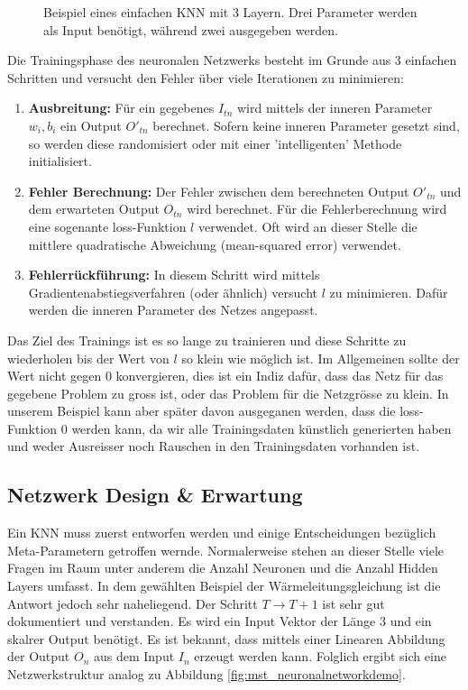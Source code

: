 \begin{figure}[h]
	\centering
	
	\label{fig:mst_neuronalnetwork}
	\caption{Beispiel eines einfachen KNN mit 3 Layern. Drei Parameter werden als Input benötigt, während zwei ausgegeben werden.}
\end{figure}

Die Trainingsphase des neuronalen Netzwerks besteht im Grunde aus 3 einfachen Schritten und versucht den Fehler über viele Iterationen zu minimieren:
\begin{enumerate}
	\item {\textbf{Ausbreitung:} Für ein gegebenes $I_{tn}$ wird mittels der inneren Parameter $w_{i}, b_{i}$ ein Output $O'_{tn}$ berechnet. Sofern keine inneren Parameter gesetzt sind, so werden diese randomisiert oder mit einer 'intelligenten' Methode initialisiert.}
	\item {\textbf{Fehler Berechnung:} Der Fehler zwischen dem berechneten Output $O'_{tn}$ und dem erwarteten Output $O_{tn}$ wird berechnet. Für die Fehlerberechnung wird eine sogenante loss-Funktion $l$ verwendet. Oft wird an dieser Stelle die mittlere quadratische Abweichung (mean-squared error) verwendet.}
	\item{ \textbf{ Fehlerrückführung:} In diesem Schritt wird mittels Gradientenabstiegsverfahren (oder ähnlich) versucht $l$ zu minimieren. Dafür werden die inneren Parameter des Netzes angepasst.}
\end{enumerate}
Das Ziel des Trainings ist es so lange zu trainieren und diese Schritte zu wiederholen bis der Wert von $l$ so klein wie möglich ist. Im Allgemeinen sollte der Wert nicht gegen 0 konvergieren, dies ist ein Indiz dafür, dass das Netz für das gegebene Problem zu gross ist, oder das Problem für die Netzgrösse zu klein. In unserem Beispiel kann aber später davon ausgeganen werden, dass die loss-Funktion 0 werden kann, da wir alle Trainingsdaten künstlich generierten haben und weder Ausreisser noch Rauschen in den Trainingsdaten vorhanden ist.

\subsection{Netzwerk Design \& Erwartung}

Ein KNN muss zuerst entworfen werden und einige Entscheidungen bezüglich Meta-Parametern getroffen wernde. Normalerweise stehen an dieser Stelle viele Fragen im Raum unter anderem die Anzahl Neuronen und die Anzahl Hidden Layers umfasst. In dem gewählten Beispiel der Wärmeleitungsgleichung ist die Antwort jedoch sehr naheliegend. Der Schritt $T \rightarrow T+1$ ist sehr gut dokumentiert und verstanden. Es wird ein Input Vektor der Länge 3 und ein skalrer Output benötigt. Es ist bekannt, dass mittels einer Linearen Abbildung der Output $O_n$ aus dem Input $I_n$ erzeugt werden kann. Folglich ergibt sich eine Netzwerkstruktur analog zu Abbildung \ref{fig:mst_neuronalnetworkdemo}.

